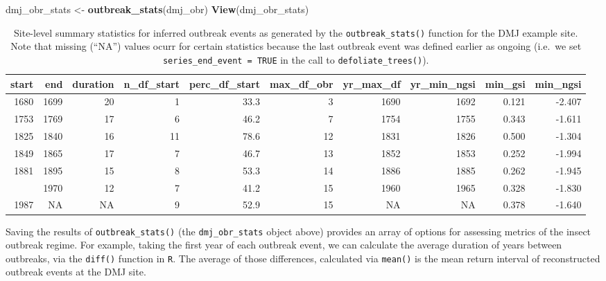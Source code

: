 \documentclass[review]{elsarticle} %
\newenvironment{Shaded}{\begin{snugshade}}{\end{snugshade}}
\newcommand{\KeywordTok}[1]{\textcolor[rgb]{0.13,0.29,0.53}{\textbf{#1}}}
\newcommand{\NormalTok}[1]{#1}
\newcommand{\StringTok}[1]{\textcolor[rgb]{0.31,0.60,0.02}{#1}}
\begin{document}
\begin{Shaded}
\begin{Highlighting}[]
\NormalTok{dmj_obr_stats <-}\StringTok{ }\KeywordTok{outbreak_stats}\NormalTok{(dmj_obr)}
\KeywordTok{View}\NormalTok{(dmj_obr_stats)}
\end{Highlighting}
\end{Shaded}



\begin{landscape}\begin{table}

\caption{\label{tab:tbl-obr}Site-level summary statistics for inferred outbreak events as generated by the \texttt{outbreak\_stats()} function for the DMJ example site. Note that missing (``NA'') values ocurr for certain statistics because the last outbreak event was defined earlier as ongoing (i.e.~we set \texttt{series\_end\_event\ =\ TRUE} in the call to \texttt{defoliate\_trees()}).}
\centering
\fontsize{7}{9}\selectfont
\begin{tabular}[t]{rrrrrrrrrr}
\toprule
start & end & duration & n\_df\_start & perc\_df\_start & max\_df\_obr & yr\_max\_df & yr\_min\_ngsi & min\_gsi & min\_ngsi\\
\midrule
1680 & 1699 & 20 & 1 & 33.3 & 3 & 1690 & 1692 & 0.121 & -2.407\\
1753 & 1769 & 17 & 6 & 46.2 & 7 & 1754 & 1755 & 0.343 & -1.611\\
1825 & 1840 & 16 & 11 & 78.6 & 12 & 1831 & 1826 & 0.500 & -1.304\\
1849 & 1865 & 17 & 7 & 46.7 & 13 & 1852 & 1853 & 0.252 & -1.994\\
1881 & 1895 & 15 & 8 & 53.3 & 14 & 1886 & 1885 & 0.262 & -1.945\\
\addlinespace
1959 & 1970 & 12 & 7 & 41.2 & 15 & 1960 & 1965 & 0.328 & -1.830\\
1987 & NA & NA & 9 & 52.9 & 15 & NA & NA & 0.378 & -1.640\\
\bottomrule
\end{tabular}
\end{table}
\end{landscape}

Saving the results of \texttt{outbreak\_stats()} (the \texttt{dmj\_obr\_stats} object above) provides an array of options for assessing metrics of the insect outbreak regime. For example, taking the first year of each outbreak event, we can calculate the average duration of years between outbreaks, via the \texttt{diff()} function in \texttt{R}. The average of those differences, calculated via \texttt{mean()} is the mean return interval of reconstructed outbreak events at the DMJ site.
\end{document}

